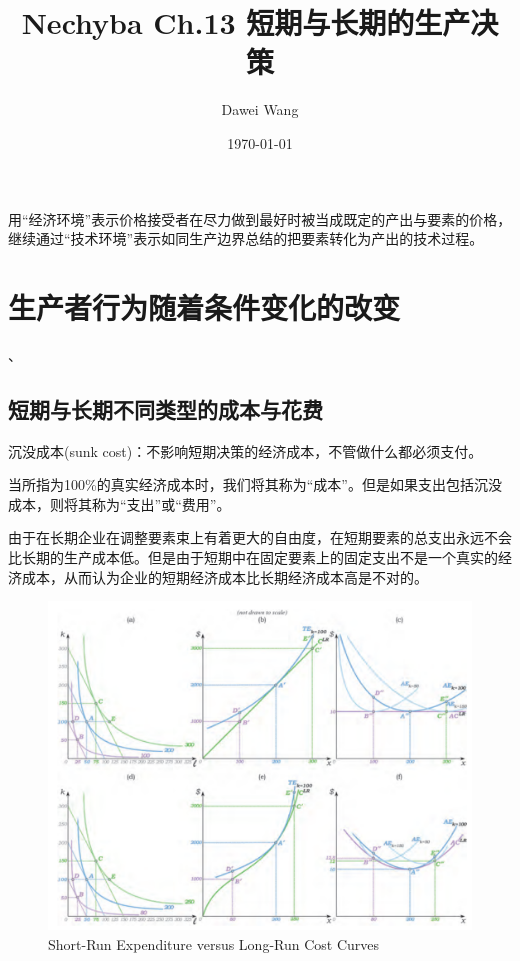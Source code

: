 \documentclass{article}
\title{Nechyba Ch.13 短期与长期的生产决策}
\author{Dawei Wang}
\date{\today}
\begin{document}
	\maketitle
用“经济环境”表示价格接受者在尽力做到最好时被当成既定的产出与要素的价格，继续通过“技术环境”表示如同生产边界总结的把要素转化为产出的技术过程。

\section{生产者行为随着条件变化的改变}、

\subsection{短期与长期不同类型的成本与花费}

沉没成本(sunk cost)：不影响短期决策的经济成本，不管做什么都必须支付。

当所指为100\%的真实经济成本时，我们将其称为“成本”。但是如果支出包括沉没成本，则将其称为“支出”或“费用”。

由于在长期企业在调整要素束上有着更大的自由度，在短期要素的总支出永远不会比长期的生产成本低。但是由于短期中在固定要素上的固定支出不是一个真实的经济成本，从而认为企业的短期经济成本比长期经济成本高是不对的。

\begin{figure}[H] %
	\centering %
	\includegraphics[width=1\textwidth]{13_1} %
	\caption{Short-Run Expenditure versus Long-Run Cost Curves} %
	\label{Fig.main2} %
\end{figure}
\end{document}
